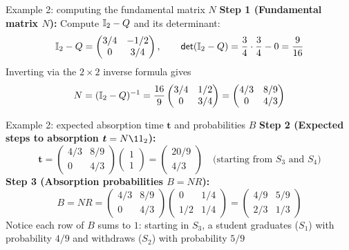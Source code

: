 \documentclass[aspectratio=169]{beamer}\usepackage[]{graphicx}\usepackage[]{xcolor}
\providecommand{\bt}{\bm{t}}
\begin{document}
\begin{frame}{Example 2: computing the fundamental matrix $N$}
\textbf{Step 1 (Fundamental matrix $N$):} Compute $\mathbb{I}_2 - Q$ and its determinant:
\[
\mathbb{I}_2 - Q = \begin{pmatrix} 3/4 & -1/2 \\ 0 & 3/4 \end{pmatrix}, \qquad
\mathsf{det}(\mathbb{I}_2 - Q) = \frac{3}{4}\cdot\frac{3}{4} - 0 = \frac{9}{16}
\]
\vfill
Inverting via the $2 \times 2$ inverse formula gives
\[
N = (\mathbb{I}_2 - Q)^{-1} = \frac{16}{9} \begin{pmatrix} 3/4 & 1/2 \\ 0 & 3/4 \end{pmatrix} = \begin{pmatrix} 4/3 & 8/9 \\ 0 & 4/3 \end{pmatrix}
\]
\end{frame}

\begin{frame}{Example 2: expected absorption time $\bt$ and probabilities $B$}
\textbf{Step 2 (Expected steps to absorption $\bt = N\11_2$):}
\[
\bt = \begin{pmatrix} 4/3 & 8/9 \\ 0 & 4/3 \end{pmatrix} \begin{pmatrix} 1 \\ 1 \end{pmatrix} = \begin{pmatrix} 20/9 \\ 4/3 \end{pmatrix} \quad \text{(starting from } S_3 \text{ and } S_4\text{)}
\]
\vfill
\textbf{Step 3 (Absorption probabilities $B = N R$):}
\[
B = N R = \begin{pmatrix} 4/3 & 8/9 \\ 0 & 4/3 \end{pmatrix} \begin{pmatrix} 0 & 1/4 \\ 1/2 & 1/4 \end{pmatrix} = \begin{pmatrix} 4/9 & 5/9 \\ 2/3 & 1/3 \end{pmatrix}
\]
\vfill
Notice each row of $B$ sums to $1$: starting in $S_3$, a student graduates ($S_1$) with probability $4/9$ and withdraws ($S_2$) with probability $5/9$
\end{frame}
\end{document}
